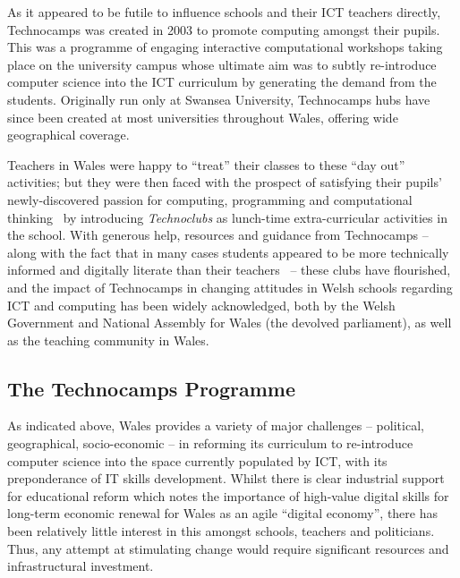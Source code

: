 \documentclass{sig-alternate}
\begin{document}
As it appeared to be futile to influence schools and their ICT
teachers directly, Technocamps was created in 2003 to promote
computing amongst their pupils.  This was a programme of engaging
interactive computational workshops taking place on the university
campus whose ultimate aim was to subtly re-introduce computer science
into the ICT curriculum by generating the demand from the students.
Originally run only at Swansea University, Technocamps hubs have since
been created at most universities throughout Wales, offering wide
geographical coverage.

Teachers in Wales were happy to ``treat'' their classes to these ``day
out'' activities; but they were then faced with the prospect of
satisfying their pupils' newly-discovered passion for computing,
programming and computational
thinking~\cite{wing:2008,calderon-et-al-hci2015} by introducing
{\emph{Technoclubs}} as lunch-time extra-curricular activities in the
school.  With generous help, resources and guidance from Technocamps
-- along with the fact that in many cases students appeared to be more
technically informed and digitally literate than their
teachers~\cite{sentance-et-al-wipsce2012} -- these clubs have
flourished, and the impact of Technocamps in changing attitudes in
Welsh schools regarding ICT and computing has been widely
acknowledged, both by the Welsh Government and National Assembly for
Wales (the devolved parliament), as well as the teaching
community in Wales.

\subsection{The Technocamps Programme}\label{technoprogramme}

As indicated above, Wales provides a variety of major challenges --
political, geographical, socio-economic -- in reforming its curriculum
to re-introduce computer science into the space currently populated by
ICT, with its preponderance of IT skills development.  Whilst there is
clear industrial support for educational reform which notes the
importance of high-value digital skills for long-term economic renewal
for Wales as an agile ``digital economy'', there has been relatively
little interest in this amongst schools, teachers and politicians.
Thus, any attempt at stimulating change would require significant
resources and infrastructural investment.
\end{document}
